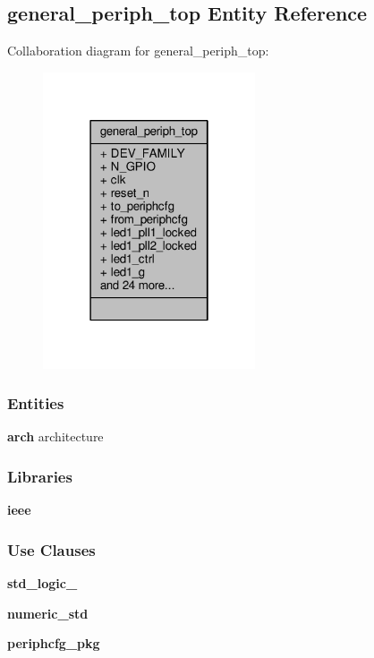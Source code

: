 \subsection{general\+\_\+periph\+\_\+top Entity Reference}
\label{classgeneral__periph__top}


Collaboration diagram for general\+\_\+periph\+\_\+top\+:\nopagebreak
\begin{figure}[H]
\begin{center}
\leavevmode
\includegraphics[width=178pt]{d9/dd9/classgeneral__periph__top__coll__graph}
\end{center}
\end{figure}
\subsubsection*{Entities}
\begin{DoxyCompactItemize}
\item 
{\bf arch} architecture
\end{DoxyCompactItemize}
\subsubsection*{Libraries}
 \begin{DoxyCompactItemize}
\item 
{\bf ieee} 
\end{DoxyCompactItemize}
\subsubsection*{Use Clauses}
 \begin{DoxyCompactItemize}
\item 
{\bf std\+\_\+logic\+\_}   
\item 
{\bf numeric\+\_\+std}   
\item 
{\bf periphcfg\+\_\+pkg}   
\end{DoxyCompactItemize}
